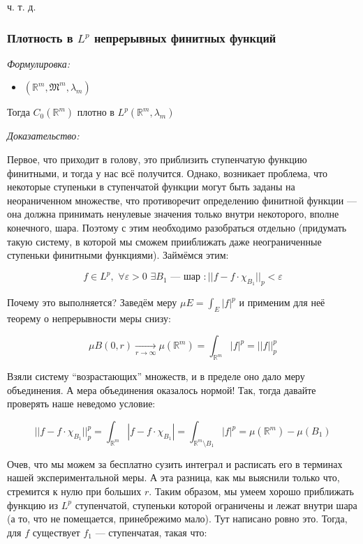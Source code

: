 \documentclass{article}
\def\dbl{\,\,}
\def\goesto#1{\underset{#1}{\longrightarrow}}
\begin{document}
ч. т. д. 

\subsubsection{Плотность в $L^p$ непрерывных финитных функций}
\textit{Формулировка:}

\begin{itemize}
    \item $(\mathbb{R}^{m}, \mathfrak{M}^{m}, \lambda_m)$
\end{itemize}

Тогда $C_0(\mathbb{R}^{m})$ плотно в $L^{p}(\mathbb{R}^{m}, \lambda_m)$

\textit{Доказательство:}

Первое, что приходит в голову, это приблизить ступенчатую функцию финитными, и тогда у нас всё получится. Однако, возникает проблема, что некоторые ступеньки в ступенчатой функции могут быть заданы на неораниченном множестве, что противоречит определению финитной функции --- она должна принимать ненулевые значения только внутри некоторого, вполне конечного, шара. Поэтому с этим необходимо разобраться отдельно (придумать такую систему, в которой мы сможем прииближать даже неограниченные ступеньки финитными функциями). Займёмся этим:

\[f \in L^p, \dbl \forall \varepsilon > 0 \dbl \exists B_1 \text{ --- шар }: ||f - f \cdot \chi_{B_1}||_p < \varepsilon\]

Почему это выполняется? Заведём меру $\mu E = \int_{E} |f|^p$ и применим для неё теорему о непрерывности меры снизу:

\[\mu B(0, r) \goesto{r \rightarrow \infty} \mu(\mathbb{R}^m) = \int_{\mathbb{R}^m} |f|^p = ||f||_p^p\]

Взяли систему ``возрастающих'' множеств, и в пределе оно дало меру объединения. А мера объединения оказалось нормой! Так, тогда давайте проверять наше неведомо условие:

\[||f - f \cdot \chi_{B_1}||_p^p = \int_{\mathbb{R}^m} |f - f \cdot \chi_{B_1}| = \int_{\mathbb{R}^m \setminus B_1} |f|^p = \mu(\mathbb{R}^m) - \mu(B_1)\]

Очев, что мы можем за бесплатно сузить интеграл и расписать его в терминах нашей экспериментальной меры. А эта разница, как мы выяснили только что, стремится к нулю при больших $r$. Таким образом, мы умеем хорошо приближать функцию из $L^p$ ступенчатой, ступеньки которой ограничены и лежат внутри шара (а то, что не помещается, принебрежимо мало). Тут написано ровно это. Тогда, для $f$ существует $f_1$ --- ступенчатая, такая что:
\end{document}
